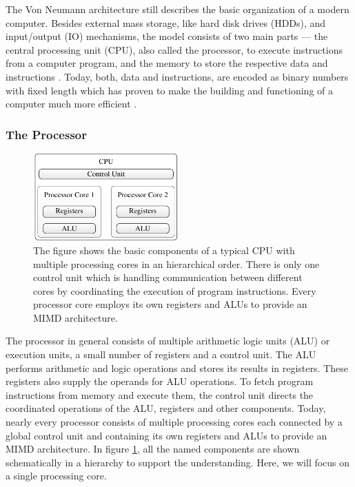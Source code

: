 \documentclass{stdlocal}
\begin{document}
    The Von Neumann architecture still describes the basic organization of a modern computer.
    Besides external mass storage, like hard disk drives (HDDs), and input/output (IO) mechanisms, the model consists of two main parts --- the central processing unit (CPU), also called the processor, to execute instructions from a computer program, and the memory to store the respective data and instructions \autocite{hennessy2019}.
    Today, both, data and instructions, are encoded as binary numbers with fixed length which has proven to make the building and functioning of a computer much more efficient \autocite{patterson2014}.

    \subsubsection*{The Processor}
    \begin{figure}
      \center
      \includegraphics[width=0.5\textwidth]{figures/cpu_components.pdf}
      \caption[Hierarchical Order of CPU Components]{%
        The figure shows the basic components of a typical CPU with multiple processing cores in an hierarchical order.
        There is only one control unit which is handling communication between different cores by coordinating the execution of program instructions.
        Every processor core employs its own registers and ALUs to provide an MIMD architecture.
      }
      \label{fig:cpu-components}
    \end{figure}
    The processor in general consists of multiple arithmetic logic units (ALU) or execution units, a small number of registers and a control unit.
    The ALU performs arithmetic and logic operations and stores its results in registers.
    These registers also supply the operands for ALU operations.
    To fetch program instructions from memory and execute them, the control unit directs the coordinated operations of the ALU, registers and other components.
    Today, nearly every processor consists of multiple processing cores each connected by a global control unit and containing its own registers and ALUs to provide an MIMD architecture.
    In figure \ref{fig:cpu-components}, all the named components are shown schematically in a hierarchy to support the understanding.
    Here, we will focus on a single processing core.
\end{document}
